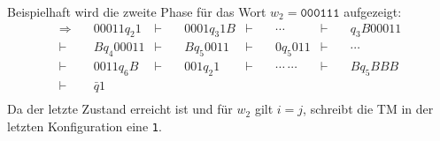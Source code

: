 \documentclass{scrartcl}%
\begin{document}
    Beispielhaft wird die zweite Phase für das Wort $w_2=\texttt{000111}$ aufgezeigt:
    \begin{equation*}
        \begin{align}
            \Rightarrow \quad & 00011q_{2}1 & \vdash \quad & 0001q_{3}1B & \vdash \quad & \cdots & \vdash \quad & q_3B00011\\
            \vdash \quad & Bq_{4}00011 & \vdash \quad & Bq_{5}0011 & \vdash \quad & 0q_{5}011 & \vdash \quad & \cdots \\
            \vdash \quad & 0011q_{6}B & \vdash \quad & 001q_{2}1 & \vdash \quad & \cdots\ \cdots & \vdash \quad & Bq_{5}BBB \\
            \vdash \quad & \bar{q}1 \\
        \end{align}
    \end{equation*}
    Da der letzte Zustand erreicht ist und für $w_2$ gilt $i=j$, schreibt die TM in der letzten Konfiguration eine \texttt{1}.
\end{document}
